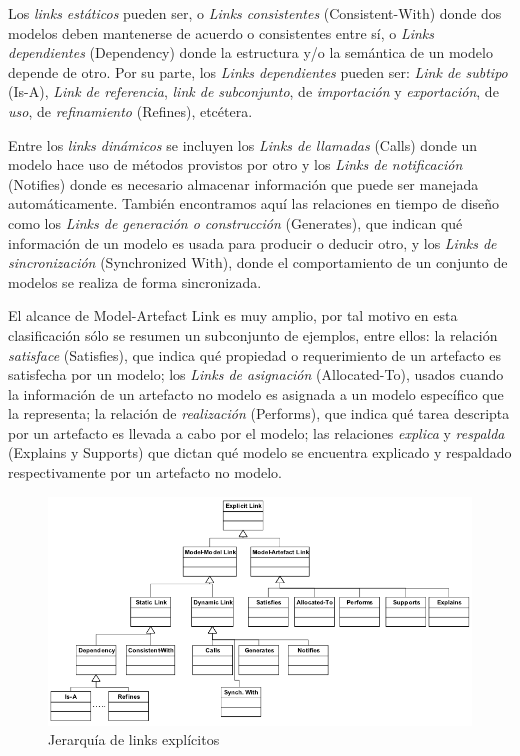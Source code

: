 \documentclass[a4paper,12pt,oneside,spanish]{book}
\begin{document}
Los \textit{links estáticos} pueden ser, o \textit{Links consistentes} (\textsf{Consistent-With}) donde dos modelos deben mantenerse de acuerdo o consistentes entre sí, o \textit{Links dependientes} (\textsf{Dependency}) donde la estructura y/o la semántica de un modelo depende de otro. Por su parte, los \textit{Links dependientes} pueden ser: \textit{Link de subtipo} (\textsf{Is-A}), \textit{Link de referencia}, \textit{link de subconjunto}, de \textit{importación} y \textit{exportación}, de \textit{uso}, de \textit{refinamiento} (\textsf{Refines}), etcétera.

Entre los \textit{links dinámicos} se incluyen los \textit{Links de llamadas} (\textsf{Calls}) donde un modelo hace uso de métodos provistos por otro y los \textit{Links de notificación} (\textsf{Notifies}) donde es necesario almacenar información que puede ser manejada automáticamente. También encontramos aquí las relaciones en tiempo de diseño como los \textit{Links de generación o construcción} (\textsf{Generates}), que indican qué información de un modelo es usada para producir o deducir otro, y los \textit{Links de sincronización} (\textsf{Synchronized With}), donde el comportamiento de un conjunto de modelos se realiza de forma sincronizada.

El alcance de \textsf{Model-Artefact Link} es muy amplio, por tal motivo en esta clasificación sólo se resumen un subconjunto de ejemplos, entre ellos: la relación \textit{satisface} (\textsf{Satisfies}), que indica qué propiedad o requerimiento de un artefacto es satisfecha por un modelo; los \textit{Links de asignación} (\textsf{Allocated-To}), usados cuando la información de un artefacto no modelo es asignada a un modelo específico que la representa; la relación de \textit{realización} (\textsf{Performs}), que indica qué tarea descripta por un artefacto es llevada a cabo por el modelo; las relaciones \textit{explica} y \textit{respalda} (\textsf{Explains} y \textsf{Supports}) que dictan qué modelo se encuentra explicado y respaldado respectivamente por un artefacto no modelo.

\begin{figure}[hbtp]
\centering
\includegraphics[scale=0.52]{./img/ExplicitTraceLinks}
\caption{Jerarquía de links explícitos}
\label{fig:LinksExplicitos}
\end{figure}
\end{document}
